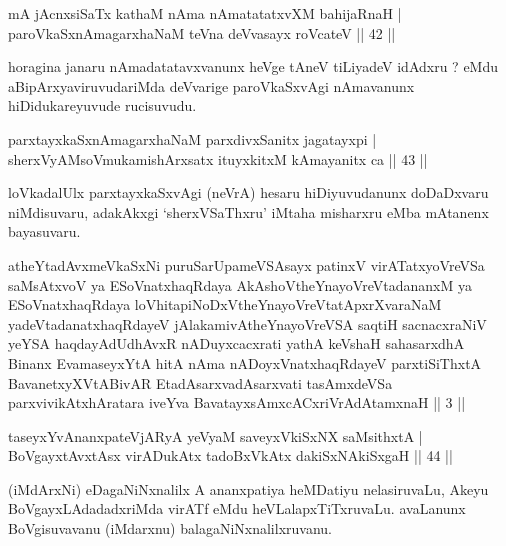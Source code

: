 
\begin{shl}
mA jAcnxsiSaTx kathaM nAma nAmatatatxvXM bahijaRnaH |\\
paroVkaSxnAmagarxhaNaM teVna deVvasayx roVcateV \hfill || 42 || 
\end{shl}

\begin{artha}
horagina janaru nAmadatatavxvanunx heVge tAneV tiLiyadeV idAdxru ? eMdu aBipArxyaviruvudariMda deVvarige paroVkaSxvAgi nAmavanunx hiDidukareyuvude rucisuvudu.
\end{artha}


\begin{shl}
parxtayxkaSxnAmagarxhaNaM parxdivxSanitx jagatayxpi |\\
sherxVyAMsoV\s mukamishArxsatx ituyxkitxM kAmayanitx ca \hfill || 43 || 
\end{shl}

\begin{artha}
loVkadalUlx parxtayxkaSxvAgi (neVrA) hesaru hiDiyuvudanunx doDaDxvaru niMdisuvaru, adakAkxgi `sherxVSaThxru' iMtaha misharxru eMba mAtanenx bayasuvaru.
\end{artha}

\begin{shl}
atheYtadAvxmeV\s kaSxNi puruSarUpameVSAsayx patinxV virATatxyoVreVSa saMsAtxvoV ya ESoV\s natxhaqRdaya AkAshoV\s theYnayoVreVtadananxM ya ESoV\s natxhaqRdaya loVhitapiNoDxV\s theYnayoVreVtatApxrXvaraNaM yadeVtadanatxhaqRdayeV jAlakamivAtheYnayoVreVSA saqtiH sacnacxraNiV yeYSA haqdayAdUdhAvxR nADuyxcacxrati yathA keVshaH sahasarxdhA Binanx EvamaseyxYtA hitA nAma nADoyxV\s natxhaqRdayeV parxtiSiThxtA BavanetxyXVtABivAR EtadAsarxvadAsarxvati tasAmxdeVSa parxvivikAtxhAratara iveYva BavatayxsAmxcACxriVrAdAtamxnaH || 3 ||
\end{shl}


\begin{shl}
taseyxYvAnanxpateVjARyA yeVyaM saveyxV\s kiSxNX saMsithxtA |\\
BoVgayxtAvxtAsx virADukAtx tadoBxVkAtx dakiSxNAkiSxgaH \hfill || 44 || 
\end{shl}

\begin{artha}
(iMdArxNi) eDagaNiNxnalilx A ananxpatiya heMDatiyu nelasiruvaLu, Akeyu BoVgayxLAdadadxriMda virATf eMdu heVLalapxTiTxruvaLu. avaLanunx BoVgisuvavanu (iMdarxnu) balagaNiNxnalilxruvanu.
\end{artha}

